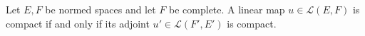 Let $E, F$ be normed spaces and let $F$ be complete. A linear map $u \in \mathcal{L}(E, F)$ is compact if and only if its adjoint $u' \in \mathcal{L}(F', E')$ is compact.
